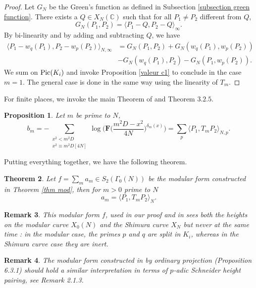 \documentclass[a4paper,12pt]{article}
\newtheorem{theorem}{Theorem}
\newtheorem{proposition}[theorem]{Proposition}
\newtheorem{remark}[theorem]{Remark}
\newcommand{\CC}{\mathbb{C}}
\begin{document}
\begin{proof}
Let $G_N$ be the Green's function as defined in Subsection \ref{subsection green function}. There exists a $Q\in X_N(\CC)$ such that for all  $P_1\neq P_2$ different from $Q$, 
    \[G_N(P_1,P_2)=\langle P_1-Q,P_2-Q\rangle _\infty.\]
    By bi-linearity and by adding and subtracting $Q$, we have
   \begin{equation}
   \begin{split}
        \langle P_1-w_q(P_1),P_2-w_p(P_2)\rangle _{N,\infty}&
    =G_N(P_1,P_2)+G_N(w_q(P_1),w_p(P_2))
    \\&-G_N(w_q(P_1),P_2)-G_N(P_1,w_p(P_2)).
         \end{split}
        \end{equation}
We sum on $\textup{Pic}(K_i)$ and invoke Proposition \ref{valeur c1}
to conclude in the case $m=1$. The general case is done in the same way using the linearity of $T_m.$
\end{proof}
For finite places, we invoke the main Theorem of \cite{anphil} and \cite{Daas} Theorem $3.2.5$. 
\begin{proposition} Let $m$ be prime to $N$,
\begin{equation}
b_m=-\sum_{\substack{x^2<m^2D\\x^2\equiv m^2D [4N]}}\log \biggl(\mathbf{F}\biggl(\frac{m^2D-x^2}{4N}\biggl)^{\delta_m(x)}\biggl)=\sum_p\langle P_1,T_mP_2\rangle _{N,p}.
\end{equation}
\end{proposition}
Putting everything together, we have the following theorem.
\begin{theorem}\label{f heights}
    Let $f=\sum_m a_m\in S_2(\Gamma_0(N))$ be the modular form constructed in Theorem 
    \ref{thm mod}, then for $m>0$ prime to $N$
    \begin{equation}
        a_m=\langle P_1,T_mP_2\rangle_N.
    \end{equation}
\end{theorem}
\begin{remark}
  This modular form $f$, used in our proof and in \cite{GrossKohnenZagier87} sees both the heights on the modular curve $X_0(N)$ and the Shimura curve $X_N$ but never at the same time : in the modular case, the primes $p$ and $q$ are split in $K_i$, whereas in the Shimura curve case they are inert.
\end{remark}
\begin{remark}
    The modular form constructed in \cite{Daas} by ordinary projection (Proposition 6.3.1) should hold a similar interpretation in terms of $p$-adic Schneider height pairing, see Remark 2.1.3.
\end{remark}

\newpage


\end{document}
